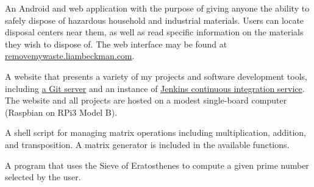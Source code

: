 \myBreak


\myBreak

An Android and web application with the purpose of giving anyone the ability to safely dispose of hazardous household and industrial materials. Users can locate disposal centers near them, as well as read specific information on the materials they wish to dispose of. The web interface may be found at \textcolor{my-blue}{\href{https://removemywaste.liambeckman.com}{removemywaste.liambeckman.com}}.

\myBreak




A website that presents a variety of my projects and software development tools, including \href{https://git.liambeckman.com}{a Git server} and an instance of \href{https://liambeckman.com/jenkins}{Jenkins continuous integration service}. The website and all projects are hosted on a modest single-board computer (Raspbian on RPi3 Model B).


\myBreak


\myBreak


A shell script for managing matrix operations including multiplication, addition, and transposition. A matrix generator is included in the available functions.

\myBreak


A program that uses the Sieve of Eratosthenes to compute a given prime number selected by the user.

